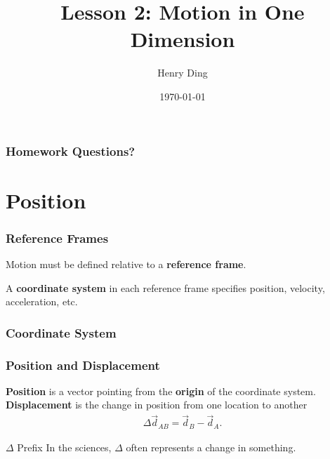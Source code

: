 \documentclass[20pt]{beamer}
\author{Henry Ding}
\date{\today}
\title{Lesson 2: Motion in One Dimension}
\begin{document}
\frame{\titlepage}

\begin{frame}
	\frametitle{Homework Questions?}
\end{frame}

\section{Position}


\begin{frame}
	\frametitle{Reference Frames}
	\begin{figure}[ht]
		\centering
		\label{fig:referenceframe}
	\end{figure}
	\begin{definition}
		Motion must be defined relative to a \textbf{reference frame}.
	\end{definition}
	\begin{definition}
		A \textbf{coordinate system} in each reference frame specifies position, velocity, acceleration, etc.
	\end{definition}
\end{frame}

\begin{frame}
	\frametitle{Coordinate System}
	\begin{figure}[ht]
		\centering
		\label{fig:coordinatesystem}
	\end{figure}
\end{frame}

\begin{frame}
	\frametitle{Position and Displacement}
	\begin{figure}[ht]
		\centering
		\label{fig:positiondisplacment}
	\end{figure}

	\begin{definition}
		\textbf{Position} is a vector pointing from the \textbf{origin} of the coordinate system.
		\textbf{Displacement} is the change in position from one location to another
		\begin{align*}
			\Delta \vec{d}_{AB} = \vec{d}_B - \vec{d}_A.
		\end{align*}
	\end{definition}

	\begin{alertblock}{$\Delta$ Prefix}
		In the sciences, $\Delta$ often represents a change in something.
	\end{alertblock}
\end{frame}
\end{document}
